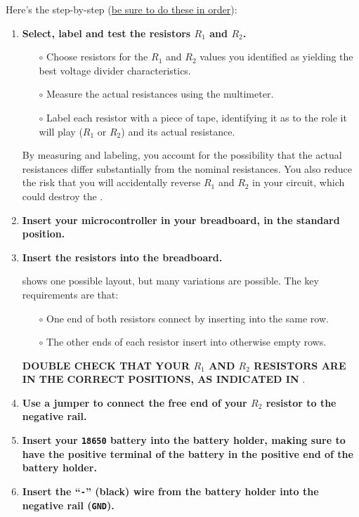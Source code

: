 Here's the step-by-step (\underline{be sure to do these in order}):
\begin{enumerate}
	\item \textbf{Select, label and test the resistors $R_1$ and $R_2$.}
	\begin{itemize}
		\item[$\circ$] Choose resistors for the $R_1$ and $R_2$ values you identified as yielding the best voltage divider characteristics.
		\item[$\circ$] Measure the actual resistances using the multimeter.
		\item[$\circ$] Label each resistor with a piece of tape, identifying it as to the role it will play ($R_1$ or $R_2$) and its actual resistance.
	\end{itemize}
	By measuring and labeling, you account for the possibility that the actual resistances differ substantially from the nominal resistances.
	You also reduce the risk that you will accidentally reverse $R_1$ and $R_2$ in your circuit, which could destroy the \adc.

	\item \textbf{Insert your microcontroller in your breadboard, in the standard position.}

	\item \textbf{Insert the resistors into the breadboard.}

	 shows one possible layout, but many variations are possible.
	The key requirements are that:
	\begin{itemize}
		\item[$\circ$] One end of both resistors connect by inserting into the same row.
		\item[$\circ$] The other ends of each resistor insert into otherwise empty rows.
	\end{itemize}
	\textbf{DOUBLE CHECK THAT YOUR $R_1$ AND $R_2$ RESISTORS ARE IN THE CORRECT POSITIONS, AS INDICATED IN }.

	\item \textbf{Use a jumper to connect the free end of your $R_2$ resistor to the negative rail.}

	\item \textbf{Insert your \texttt{\texttt{18650}} battery into the battery holder, making sure to have the positive terminal of the battery in the positive end of the battery holder.}

	\item \textbf{Insert the ``\texttt{-}'' (black) wire from the battery holder into the negative rail  (\texttt{GND}).}


\end{enumerate}
